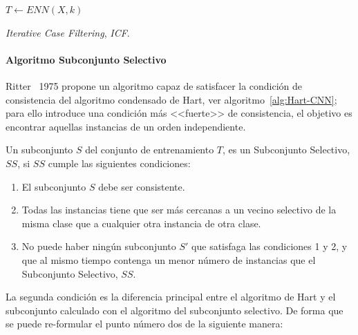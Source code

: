 \begin{algorithm}[H]
  	\BlankLine
  $T \leftarrow ENN(X,k)$\\  	
	\caption{\textit{Iterative Case Filtering}, \textit{ICF}.}\label{alg:Brighton-ICF}
\end{algorithm}

\paragraph{Algoritmo Subconjunto Selectivo}\label{paragraph:SS}
\hfill \break
Ritter~\cite{ritter1975algorithm} 1975 propone un algoritmo capaz de satisfacer la condición de consistencia del algoritmo condensado de Hart, ver algoritmo~\ref{alg:Hart-CNN}; para ello introduce una condición más <<fuerte>> de consistencia, el objetivo es encontrar aquellas instancias de un orden independiente. 

Un subconjunto $S$ del conjunto de entrenamiento $T$, es un Subconjunto Selectivo, $SS$, si $SS$ cumple las siguientes condiciones:
\begin{enumerate}
\item El subconjunto $S$ debe ser consistente.
\item Todas las instancias tiene que ser más cercanas a un vecino selectivo de la misma clase que a cualquier otra instancia de otra clase.
\item No puede haber ningún subconjunto $S'$ que satisfaga las condiciones 1 y 2, y que al mismo tiempo contenga un menor número de instancias que el Subconjunto Selectivo, $SS$.
\end{enumerate}

La segunda condición es la diferencia principal entre el algoritmo de Hart y el subconjunto calculado con el algoritmo del subconjunto selectivo. De forma que se puede re-formular el punto número dos de la siguiente manera:

